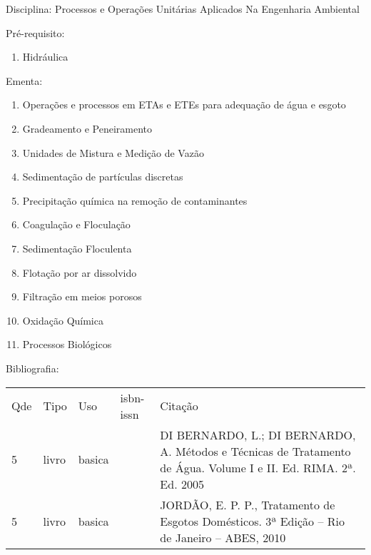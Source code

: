\documentclass[12pt,a4paper,twoside]{report}
\begin{document}
Disciplina: Processos e Operações Unitárias Aplicados Na Engenharia Ambiental

Pré-requisito:
\begin{enumerate}
\item Hidráulica
\end{enumerate}

Ementa:
\begin{enumerate}
\item Operações e processos em ETAs e ETEs para adequação de água e esgoto
\item Gradeamento e Peneiramento
\item Unidades de Mistura e Medição de Vazão
\item Sedimentação de partículas discretas
\item Precipitação química na remoção de contaminantes
\item Coagulação e Floculação
\item Sedimentação Floculenta
\item Flotação por ar dissolvido
\item Filtração em meios porosos
\item Oxidação Química
\item Processos Biológicos
\end{enumerate}

Bibliografia:
\begin{tabular}{lllll}
Qde & Tipo & Uso & isbn-issn & Citação \\
5&livro&basica&&DI BERNARDO, L.; DI BERNARDO, A. Métodos e Técnicas de Tratamento de Água. Volume I e II. Ed. RIMA. 2ª. Ed. 2005\\
5&livro&basica&&JORDÃO, E. P. P., Tratamento de Esgotos Domésticos. 3ª Edição – Rio de Janeiro – ABES, 2010\\
\end{tabular}
\end{document}
